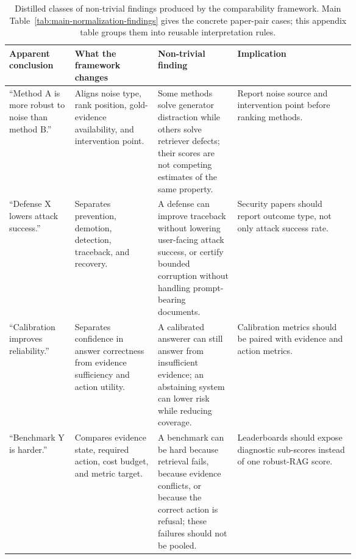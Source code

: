 \begin{table}[t]
\centering
\scriptsize
\renewcommand{\arraystretch}{0.9}
\begin{tabularx}{\linewidth}{>{\raggedright\arraybackslash}p{0.19\linewidth}>{\raggedright\arraybackslash}p{0.24\linewidth}>{\raggedright\arraybackslash}p{0.23\linewidth}X}
\toprule
\textbf{Apparent conclusion} & \textbf{What the framework changes} & \textbf{Non-trivial finding} & \textbf{Implication} \\
\midrule
``Method A is more robust to noise than method B.'' & Aligns noise type, rank position, gold-evidence availability, and intervention point. & Some methods solve generator distraction while others solve retriever defects; their scores are not competing estimates of the same property. & Report noise source and intervention point before ranking methods. \\
``Defense X lowers attack success.'' & Separates prevention, demotion, detection, traceback, and recovery. & A defense can improve traceback without lowering user-facing attack success, or certify bounded corruption without handling prompt-bearing documents. & Security papers should report outcome type, not only attack success rate. \\
``Calibration improves reliability.'' & Separates confidence in answer correctness from evidence sufficiency and action utility. & A calibrated answerer can still answer from insufficient evidence; an abstaining system can lower risk while reducing coverage. & Calibration metrics should be paired with evidence and action metrics. \\
``Benchmark Y is harder.'' & Compares evidence state, required action, cost budget, and metric target. & A benchmark can be hard because retrieval fails, because evidence conflicts, or because the correct action is refusal; these failures should not be pooled. & Leaderboards should expose diagnostic sub-scores instead of one robust-RAG score. \\
\bottomrule
\end{tabularx}
\caption{Distilled classes of non-trivial findings produced by the comparability framework. Main Table~\ref{tab:main-normalization-findings} gives the concrete paper-pair cases; this appendix table groups them into reusable interpretation rules.}
\label{tab:nontrivial-findings}
\end{table}
